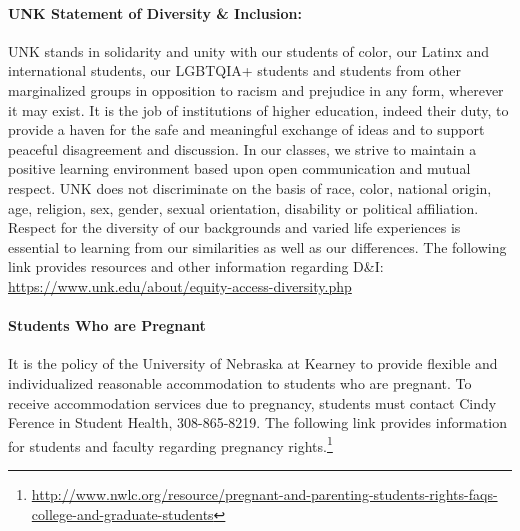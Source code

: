 \documentclass[12pt]{article}
\newcounter{ex}\setcounter{ex}{0}
\begin{document}
\paragraph{UNK Statement of Diversity \& Inclusion:} UNK stands in solidarity and unity with our students of color, our Latinx and international students, our LGBTQIA+ students and students from other marginalized groups in opposition to racism and prejudice in any form, wherever it may exist. It is the job of institutions of higher education, indeed their duty, to provide a haven for the safe and meaningful exchange of ideas and to support peaceful disagreement and discussion. In our classes, we strive to maintain a positive learning environment based upon open communication and mutual respect. UNK does not discriminate on the basis of race, color, national origin, age, religion, sex, gender, sexual orientation, disability or political affiliation. Respect for the diversity of our backgrounds and varied 
life experiences is essential to learning from our similarities as well as our differences. The following link provides resources and other information regarding D\&I: 
\url{https://www.unk.edu/about/equity-access-diversity.php}

\paragraph{Students Who are Pregnant} It is the policy of the University of Nebraska at Kearney to provide flexible and individualized reasonable accommodation to students who are pregnant. To receive accommodation services due to pregnancy, students must contact Cindy Ference in Student Health, 308-865-8219. The following link provides information for students and faculty regarding pregnancy rights.\footnote{\tiny  \url{http://www.nwlc.org/resource/pregnant-and-parenting-students-rights-faqs-college-and-graduate-students}}
\end{document}
